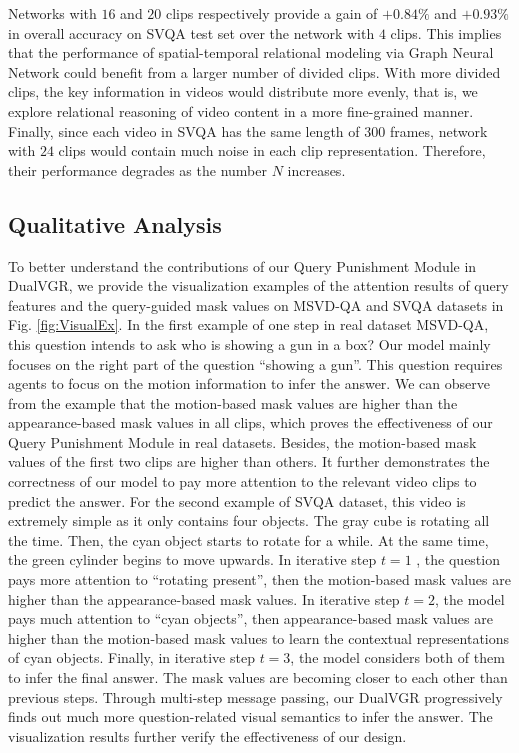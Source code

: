 \documentclass[journal]{IEEEtran}
\begin{document}
Networks with $16$ and $20$ clips respectively provide a gain of $+0.84\%$ and $+0.93\%$ in overall accuracy on SVQA test set over the network with $4$ clips. This implies that the performance of spatial-temporal relational modeling via Graph Neural Network could benefit from a larger number of divided clips. With more divided clips, the key information in videos would distribute more evenly, that is, we explore relational reasoning of video content in a more fine-grained manner. Finally, since each video in SVQA has the same length of $300$ frames, network with $24$ clips would contain much noise in each clip representation. Therefore, their performance degrades as the number $N$ increases.  
\subsection{Qualitative Analysis}
To better understand the contributions of our Query Punishment Module in DualVGR, we provide the visualization examples of the attention results of query features and the query-guided mask values on MSVD-QA and SVQA datasets in Fig. \ref{fig:VisualEx}.
In the first example of one step in real dataset MSVD-QA, this question intends to ask who is showing a gun in a box? Our model mainly focuses on the right part of the question ``showing a gun''. This question requires agents to focus on the motion information to infer the answer. We can observe from the example that the motion-based mask values are higher than the appearance-based mask values in all clips, which proves the effectiveness of our Query Punishment Module in real datasets. Besides, the motion-based mask values of the first two clips are higher than others. It further demonstrates the correctness of our model to pay more attention to the relevant video clips to predict the answer. For the second example of SVQA dataset, this video is extremely simple as it only contains four objects. The gray cube is rotating all the time. Then, the cyan object starts to rotate for a while. At the same time, the green cylinder begins to move upwards. In iterative step $t = 1$ , the question pays more attention to ``rotating present'', then the motion-based mask values are higher than the appearance-based mask values. In iterative step $t = 2$, the model pays much attention to ``cyan objects'', then appearance-based mask values are higher than the motion-based mask values to learn the contextual representations of cyan objects. Finally, in iterative step $t = 3$, the model considers both of them to infer the final answer. The mask values are becoming closer to each other than previous steps. Through multi-step message passing, our DualVGR progressively finds out much more question-related visual semantics to infer the answer. The visualization results further verify the effectiveness of our design.
\end{document}
